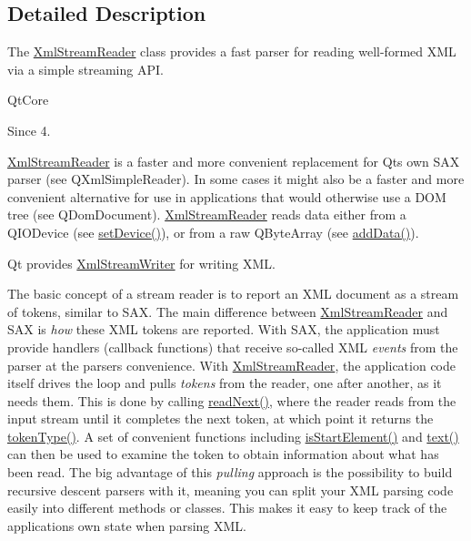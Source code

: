 \subsection{Detailed Description}
The \hyperlink{class_xml_stream_reader}{Xml\+Stream\+Reader} class provides a fast parser for reading well-\/formed X\+ML via a simple streaming A\+PI. 

Qt\+Core  \begin{DoxySince}{Since}
4.
\end{DoxySince}
\hyperlink{class_xml_stream_reader}{Xml\+Stream\+Reader} is a faster and more convenient replacement for Qt\textquotesingle{}s own S\+AX parser (see Q\+Xml\+Simple\+Reader). In some cases it might also be a faster and more convenient alternative for use in applications that would otherwise use a D\+OM tree (see Q\+Dom\+Document). \hyperlink{class_xml_stream_reader}{Xml\+Stream\+Reader} reads data either from a Q\+I\+O\+Device (see \hyperlink{class_xml_stream_reader_a0d166c5c7814d44a0015a82f0500cee5}{set\+Device()}), or from a raw Q\+Byte\+Array (see \hyperlink{class_xml_stream_reader_add6baa0f8790fc528c1fa6e05755f96b}{add\+Data()}).

Qt provides \hyperlink{class_xml_stream_writer}{Xml\+Stream\+Writer} for writing X\+ML.

The basic concept of a stream reader is to report an X\+ML document as a stream of tokens, similar to S\+AX. The main difference between \hyperlink{class_xml_stream_reader}{Xml\+Stream\+Reader} and S\+AX is {\itshape how} these X\+ML tokens are reported. With S\+AX, the application must provide handlers (callback functions) that receive so-\/called X\+ML {\itshape events} from the parser at the parser\textquotesingle{}s convenience. With \hyperlink{class_xml_stream_reader}{Xml\+Stream\+Reader}, the application code itself drives the loop and pulls {\itshape tokens} from the reader, one after another, as it needs them. This is done by calling \hyperlink{class_xml_stream_reader_adb18e6f9842e9b470cde16385732ad84}{read\+Next()}, where the reader reads from the input stream until it completes the next token, at which point it returns the \hyperlink{class_xml_stream_reader_a2c26bfb63c27f2992e24f038d65c8c0a}{token\+Type()}. A set of convenient functions including \hyperlink{class_xml_stream_reader_a78cb57350cabab5e7ca7c1a8963a774d}{is\+Start\+Element()} and \hyperlink{class_xml_stream_reader_a1d129d0171b231efac34d7ee4480a50f}{text()} can then be used to examine the token to obtain information about what has been read. The big advantage of this {\itshape pulling} approach is the possibility to build recursive descent parsers with it, meaning you can split your X\+ML parsing code easily into different methods or classes. This makes it easy to keep track of the application\textquotesingle{}s own state when parsing X\+ML.

